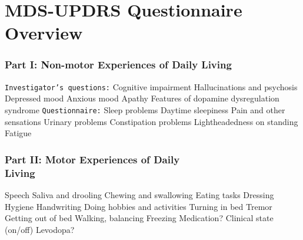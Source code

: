 \newpage
\section{MDS-UPDRS Questionnaire Overview \cite{Goetz2008}} \label{app:mds-updrs}
\begin{multicols}{2}
\subsubsection*{Part I: Non-motor Experiences of Daily Living\vspace{-0.5cm}}
\texttt{Investigator's questions:}\newline
Cognitive impairment\newline
Hallucinations and psychosis\newline
Depressed mood\newline
Anxious mood\newline
Apathy\newline
Features of dopamine dysregulation syndrome \newline 
\texttt{Questionnaire:}\newline
Sleep problems\newline
Daytime sleepiness\newline
Pain and other sensations\newline
Urinary problems \newline
Constipation problems\newline
Lightheadedness on standing\newline
Fatigue%
%
\vspace{-0.5cm}
\subsubsection*{Part II: Motor Experiences of Daily \\Living \vspace{-0.5cm}}
Speech\newline
Saliva and drooling\newline
Chewing and swallowing\newline
Eating tasks\newline
Dressing\newline
Hygiene\newline
Handwriting\newline
Doing hobbies and activities\newline
Turning in bed\newline
Tremor\newline
Getting out of bed\newline
Walking, balancing\newline
Freezing\newline
Medication?\newline
Clinical state (on/off)\newline
Levodopa?%
%
\vspace{-0.5cm}

\end{multicols}
